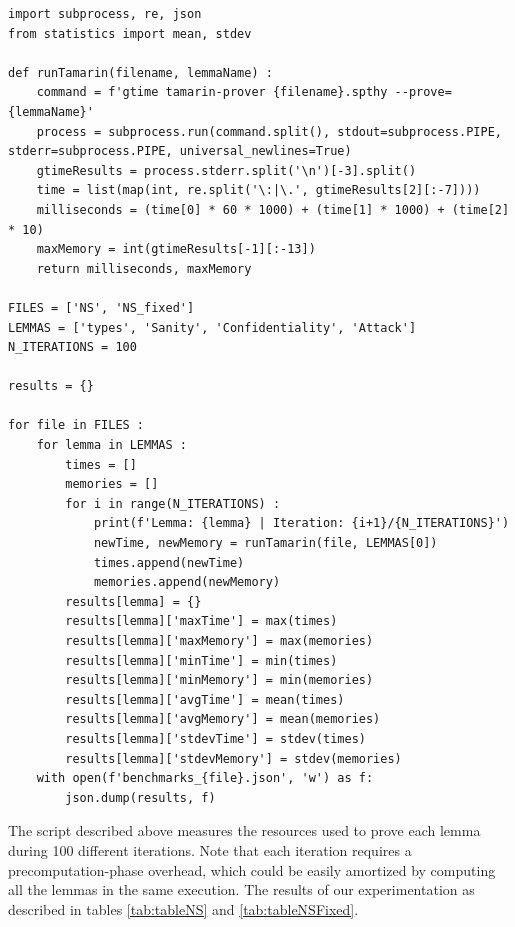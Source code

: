 \documentclass[fleqn,10pt]{SelfArx} %
\begin{document}
\begin{lstlisting}
import subprocess, re, json
from statistics import mean, stdev

def runTamarin(filename, lemmaName) :
    command = f'gtime tamarin-prover {filename}.spthy --prove={lemmaName}'
    process = subprocess.run(command.split(), stdout=subprocess.PIPE, stderr=subprocess.PIPE, universal_newlines=True)
    gtimeResults = process.stderr.split('\n')[-3].split()
    time = list(map(int, re.split('\:|\.', gtimeResults[2][:-7])))
    milliseconds = (time[0] * 60 * 1000) + (time[1] * 1000) + (time[2] * 10)
    maxMemory = int(gtimeResults[-1][:-13])
    return milliseconds, maxMemory

FILES = ['NS', 'NS_fixed']
LEMMAS = ['types', 'Sanity', 'Confidentiality', 'Attack']
N_ITERATIONS = 100

results = {}

for file in FILES :
    for lemma in LEMMAS :
        times = []
        memories = []
        for i in range(N_ITERATIONS) :
            print(f'Lemma: {lemma} | Iteration: {i+1}/{N_ITERATIONS}')
            newTime, newMemory = runTamarin(file, LEMMAS[0])
            times.append(newTime)
            memories.append(newMemory)
        results[lemma] = {}
        results[lemma]['maxTime'] = max(times)
        results[lemma]['maxMemory'] = max(memories)
        results[lemma]['minTime'] = min(times)
        results[lemma]['minMemory'] = min(memories)
        results[lemma]['avgTime'] = mean(times)
        results[lemma]['avgMemory'] = mean(memories)
        results[lemma]['stdevTime'] = stdev(times)
        results[lemma]['stdevMemory'] = stdev(memories)
    with open(f'benchmarks_{file}.json', 'w') as f:
        json.dump(results, f)
\end{lstlisting}

The script described above measures the resources used to prove each lemma during 100 different iterations. Note that each iteration requires a precomputation-phase overhead, which could be easily amortized by computing all the lemmas in the same execution. The results of our experimentation as described in tables \ref{tab:tableNS} and \ref{tab:tableNSFixed}.
\end{document}
